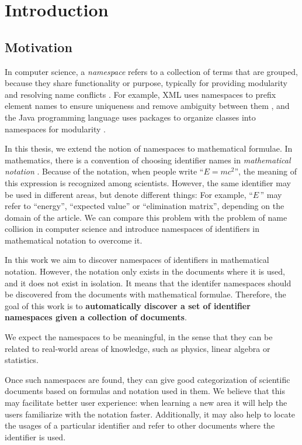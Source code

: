 \section{Introduction}

\subsection{Motivation}

In computer science, a \emph{namespace} refers to a collection of terms
that are grouped, because they share functionality or purpose,
typically for providing modularity and resolving name conflicts \cite{duval2002metadata}.
For example, XML uses namespaces to prefix element names to ensure uniqueness and remove ambiguity between them \cite{xmlnamespaces}, and the Java programming language uses packages to organize classes into namespaces for modularity \cite{gosling2014java}.

In this thesis, we extend the notion of namespaces to mathematical formulae. 
In mathematics, there is a convention of choosing identifier names in
\emph{mathematical notation} \cite{wikinotation}. Because of the notation, 
when people write ``$E=mc^2$'', the meaning of this expression is recognized among scientists. 
However, the same identifier may be used in different areas, but denote 
different things: For example, ``$E$\,'' may refer to ``energy'', ``expected value'' or 
``elimination matrix'', depending on the domain of the article.
We can compare this problem with the problem of name collision in computer science 
and introduce namespaces of identifiers in mathematical notation to overcome it. 

In this work we aim to discover namespaces of identifiers in mathematical notation. 
However, the notation only exists in the documents where it is used, and it does 
not exist in isolation. 
It means that the identifer namespaces should be discovered from the documents 
with mathematical formulae. 
Therefore, the goal of this work is to \textbf{automatically discover a set of identifier
namespaces given a collection of documents}.


We expect the namespaces to be meaningful, in the sense that they can be related to real-world areas of knowledge, such as physics, linear algebra or statistics.

Once such namespaces are found, they can give good categorization of scientific 
documents based on formulas and notation used in them. We believe that this may 
facilitate better user experience: when learning a new area it will help the users 
familiarize with the notation faster.
Additionally, it may also help to locate the usages of a particular identifier and 
refer to other documents where the identifier is used. 

